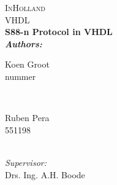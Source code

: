 \documentclass[12pt]{report}
\begin{document}
	\begin{titlepage}
		
		\pagecolor{landanimal}\afterpage{\nopagecolor}
		\center	
		
		\color{white}
		\textsc{\LARGE InHolland}\\[1.5cm] %
		\textsc{\Large VHDL}\\[2.5cm] %
		
		
		\huge \bfseries S88-n Protocol in VHDL \\[2.0cm] %
		
		\emph{Authors:}\\
		
		\begin{minipage}{0.4\textwidth}
			\begin{flushleft} \large
				
				Koen Groot \\ nummer
			\end{flushleft}
		\end{minipage}
		~
		\begin{minipage}{0.4\textwidth}
			\begin{flushright} \large
				\large Ruben Pera \\ 551198
			\end{flushright}
		\end{minipage}
		\\[1cm]
		\emph{Supervisor:} \\
		\large Drs. Ing. A.H. Boode 
	
		
	\end{titlepage}

	\tableofcontents
	\clearpage
	

	
	
	
	
	
		
\end{document}
